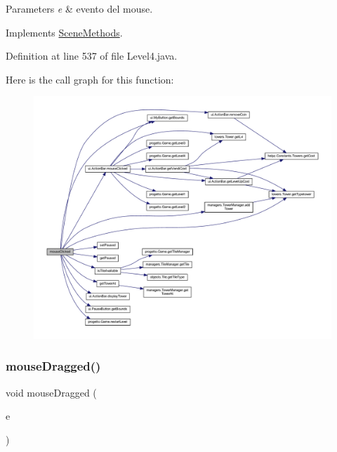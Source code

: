 \begin{DoxyParams}{Parameters}
{\em e} & evento del mouse. \\
\hline
\end{DoxyParams}


Implements \hyperlink{interfacescenes_1_1_scene_methods_a45d56bd84238e8b56589dfc732e2b2cf}{Scene\+Methods}.



Definition at line 537 of file Level4.\+java.

Here is the call graph for this function\+:\nopagebreak
\begin{figure}[H]
\begin{center}
\leavevmode
\includegraphics[width=350pt]{classscenes_1_1_level4_a45d56bd84238e8b56589dfc732e2b2cf_cgraph}
\end{center}
\end{figure}
\mbox{\label{classscenes_1_1_level4_adbfc0588c017133c9b7070474402b72f}} 
\subsubsection{\texorpdfstring{mouse\+Dragged()}{mouseDragged()}}
{\footnotesize\ttfamily void mouse\+Dragged (\begin{DoxyParamCaption}\item[{Mouse\+Event}]{e }\end{DoxyParamCaption})}



